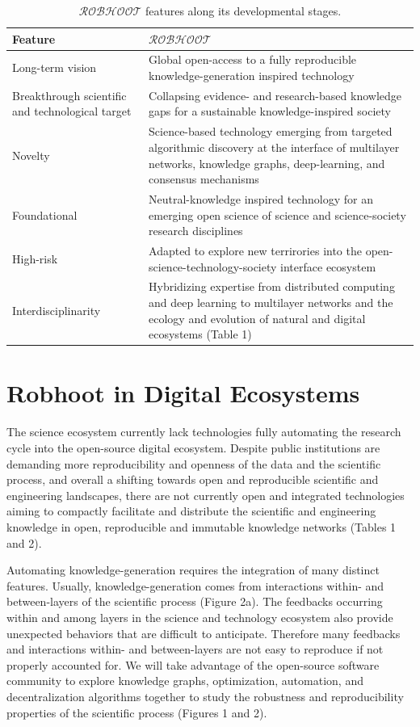 \documentclass[10pt, a4paper, twocolumn]{article} %
\begin{document}
\begin{table}[ht]
\begin{tabular}{ p{3.5cm} | p{14cm}}
  \hline \hline
  \textbf{Feature} &\textbf{$\mathcal{ROBHOOT}$}\\  \hline
  Long-term vision & Global open-access to a fully reproducible knowledge-generation inspired technology \\ \hline
  Breakthrough scientific and technological target & Collapsing evidence- and research-based knowledge gaps for a sustainable knowledge-inspired society\\ \hline
  Novelty & Science-based technology emerging from targeted algorithmic discovery at the interface of multilayer networks, knowledge graphs, deep-learning, and consensus mechanisms\\ \hline
  Foundational & Neutral-knowledge inspired technology for an emerging open science of science and science-society research disciplines \\ \hline
  High-risk & Adapted to explore new terrirories into the open-science-technology-society interface ecosystem \\ \hline
  Interdisciplinarity & Hybridizing expertise from distributed computing and deep learning to multilayer networks and the ecology and evolution of natural and digital ecosystems (Table 1) \\ \hline
  \bottomrule

\end{tabular}
\caption{{\bf $\mathcal{ROBHOOT}$} features along its developmental stages.}
\end{table}
 
  \section{Robhoot in Digital Ecosystems}
  The science ecosystem currently lack technologies fully automating
  the research cycle into the open-source digital ecosystem. Despite
  public institutions are demanding more reproducibility and openness
  of the data and the scientific process, and overall a shifting
  towards open and reproducible scientific and engineering landscapes,
  there are not currently open and integrated technologies aiming to
  compactly facilitate and distribute the scientific and engineering
  knowledge in open, reproducible and immutable knowledge networks
  (Tables 1 and 2).
  
  Automating knowledge-generation requires the integration of many
  distinct features. Usually, knowledge-generation comes from
  interactions within- and between-layers of the scientific process
  (Figure 2a). The feedbacks occurring within and among layers in the
  science and technology ecosystem also provide unexpected behaviors
  that are difficult to anticipate. Therefore many feedbacks and
  interactions within- and between-layers are not easy to reproduce if
  not properly accounted for. We will take advantage of the
  open-source software community to explore knowledge graphs,
  optimization, automation, and decentralization algorithms together
  to study the robustness and reproducibility properties of the
  scientific process (Figures 1 and 2).
\end{document}
